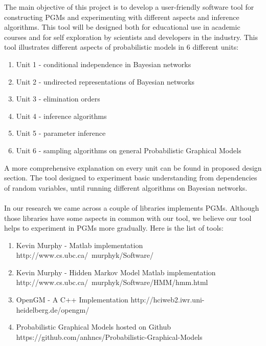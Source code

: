 \documentclass{article}
\begin{document}
    The main objective of this project is to develop a user-friendly software tool for constructing PGMs and experimenting with different aspects and inference algorithms. This tool will be designed both for educational use in academic courses and for self exploration by scientists and developers in the industry. This tool illustrates different aspects of probabilistic models in 6 different units:
    \begin{enumerate}
        \item Unit 1 - conditional independence in Bayesian networks
        \item Unit 2 - undirected representations of Bayesian networks
        \item Unit 3 - elimination orders
        \item Unit 4 - inference algorithms
        \item Unit 5 - parameter inference
        \item Unit 6 - sampling algorithms on general Probabilistic Graphical Models
    \end{enumerate}
    A more comprehensive explanation on every unit can be found in proposed design section. The tool designed to experiment basic understanding from dependencies of random variables, until running different algorithms on Bayesian networks.\\~\\

    In our research we came across a couple of libraries implements PGMs. Although those libraries have some aspects in common with our tool, we believe our tool helps to experiment in PGMs more gradually. Here is the list of tools:
    \begin{enumerate}
        \item Kevin Murphy - Matlab implementation http://www.cs.ubc.ca/~murphyk/Software/
        \item Kevin Murphy - Hidden Markov Model Matlab implementation http://www.cs.ubc.ca/~murphyk/Software/HMM/hmm.html
        \item OpenGM - A C++ Implementation http://hciweb2.iwr.uni-heidelberg.de/opengm/
        \item Probabilistic Graphical Models hosted on Github https://github.com/anhncs/Probabilistic-Graphical-Models
    \end{enumerate}
    
    \pagebreak
\end{document}
